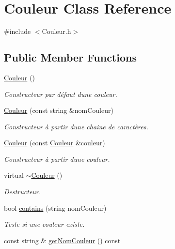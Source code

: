 \hypertarget{class_couleur}{}\section{Couleur Class Reference}
\label{class_couleur}


{\ttfamily \#include $<$Couleur.\+h$>$}

\subsection*{Public Member Functions}
\begin{DoxyCompactItemize}
\item 
\hyperlink{class_couleur_a687a457edb08b51dbcd0299bb0b6a882}{Couleur} ()
\begin{DoxyCompactList}\small\item\em Constructeur par défaut d\textquotesingle{}une couleur. \end{DoxyCompactList}\item 
\hyperlink{class_couleur_a3875e178605e5a425a473b9034f796b3}{Couleur} (const string \&nom\+Couleur)
\begin{DoxyCompactList}\small\item\em Constructeur à partir d\textquotesingle{}une chaine de caractères. \end{DoxyCompactList}\item 
\hyperlink{class_couleur_ae5694f3994756524981394433bbdc85f}{Couleur} (const \hyperlink{class_couleur}{Couleur} \&couleur)
\begin{DoxyCompactList}\small\item\em Constructeur à partir d\textquotesingle{}une couleur. \end{DoxyCompactList}\item 
virtual \hyperlink{class_couleur_ad3be30be83649bc5db48ef46b592aec2}{$\sim$\+Couleur} ()
\begin{DoxyCompactList}\small\item\em Destructeur. \end{DoxyCompactList}\item 
bool \hyperlink{class_couleur_ab426fe44e27a92cf0faf8fee1e086a5f}{contains} (string nom\+Couleur)
\begin{DoxyCompactList}\small\item\em Teste si une couleur existe. \end{DoxyCompactList}\item 
const string \& \hyperlink{class_couleur_a0e38cc8477e1618b317124ab372c3501}{get\+Nom\+Couleur} () const

\end{DoxyCompactItemize}
